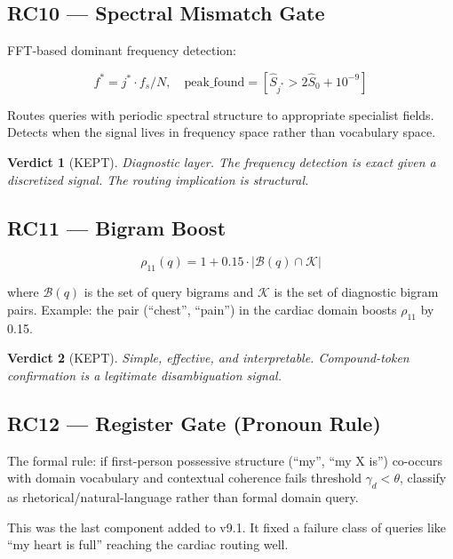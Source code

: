 \documentclass[11pt]{article}
\newtheorem{verdict}{Verdict}
\begin{document}
\subsection{RC10 --- Spectral Mismatch Gate}

FFT-based dominant frequency detection:

\begin{equation}
  f^* = j^* \cdot f_s / N, \quad \text{peak\_found} = [\hat{S}_{j^*} > 2\hat{S}_0 + 10^{-9}]
\end{equation}

Routes queries with periodic spectral structure to appropriate specialist fields. Detects when the signal lives in frequency space rather than vocabulary space.

\begin{verdict}[\textcolor{keepgreen}{KEPT}]
Diagnostic layer. The frequency detection is exact given a discretized signal. The routing implication is structural.
\end{verdict}

\subsection{RC11 --- Bigram Boost}

\begin{equation}
  \rho_{11}(q) = 1 + 0.15 \cdot |\mathcal{B}(q) \cap \mathcal{K}|
\end{equation}

where $\mathcal{B}(q)$ is the set of query bigrams and $\mathcal{K}$ is the set of diagnostic bigram pairs. Example: the pair (``chest'', ``pain'') in the cardiac domain boosts $\rho_{11}$ by 0.15.

\begin{verdict}[\textcolor{keepgreen}{KEPT}]
Simple, effective, and interpretable. Compound-token confirmation is a legitimate disambiguation signal.
\end{verdict}

\subsection{RC12 --- Register Gate (Pronoun Rule)}

The formal rule: if first-person possessive structure (``my'', ``my X is'') co-occurs with domain vocabulary and contextual coherence fails threshold $\gamma_d < \theta$, classify as rhetorical/natural-language rather than formal domain query.

This was the last component added to v9.1. It fixed a failure class of queries like ``my heart is full'' reaching the cardiac routing well.
\end{document}
